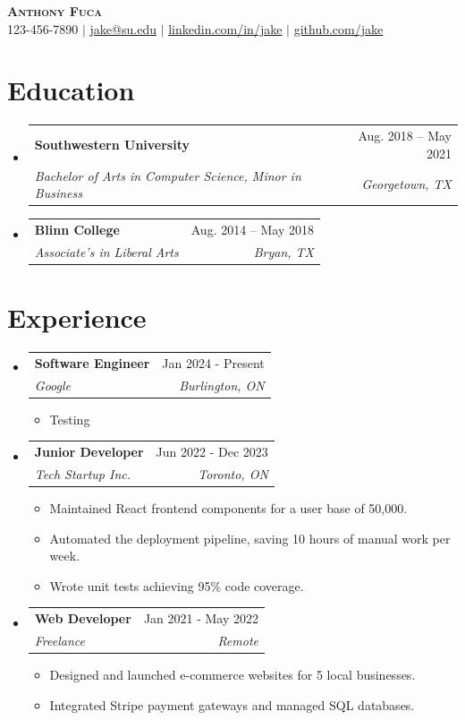 \documentclass[letterpaper,11pt]{article}
\makeatletter
\newcommand{\resumeItem}[1]{
  \item\small{
    {#1 \vspace{-2pt}}
  }
}
\newcommand{\resumeSubheading}[4]{
  \vspace{-2pt}\item
    \begin{tabular*}{0.97\textwidth}[t]{l@{\extracolsep{\fill}}r}
      \textbf{#1} & #2 \\
      \textit{\small#3} & \textit{\small #4} \\
    \end{tabular*}\vspace{-7pt}
}
\newcommand{\resumeSubHeadingListStart}{\begin{itemize}[leftmargin=0.15in, label={}]}
\newcommand{\resumeSubHeadingListEnd}{\end{itemize}}
\newcommand{\resumeItemListStart}{\begin{itemize}}
\newcommand{\resumeItemListEnd}{\end{itemize}\vspace{-5pt}}
\makeatother
\begin{document}

\begin{center}
    \textbf{\Huge \scshape Anthony Fuca} \\ \vspace{1pt}
    \small 123-456-7890 $|$ \href{mailto:x@x.com}{\underline{jake@su.edu}} $|$ 
    \href{https://linkedin.com/in/...}{\underline{linkedin.com/in/jake}} $|$
    \href{https://github.com/...}{\underline{github.com/jake}}
\end{center}

\section{Education}
    \resumeSubHeadingListStart
                    \resumeSubheading
        {Southwestern University}{Aug. 2018 -- May 2021}
        {Bachelor of Arts in Computer Science, Minor in Business}{Georgetown, TX}
                                    \resumeSubheading
        {Blinn College}{Aug. 2014 -- May 2018}
        {Associate's in Liberal Arts}{Bryan, TX}
                      \resumeSubHeadingListEnd
    \section{Experience}
    \resumeSubHeadingListStart
                    \resumeSubheading
        {Software Engineer}{Jan 2024 - Present}
        {Google}{Burlington, ON}
                  \resumeItemListStart
                \resumeItem{Testing}
              \resumeItemListEnd
                              \resumeSubheading
        {Junior Developer}{Jun 2022 - Dec 2023}
        {Tech Startup Inc.}{Toronto, ON}
                  \resumeItemListStart
                \resumeItem{Maintained React frontend components for a user base of 50,000.}
                \resumeItem{Automated the deployment pipeline, saving 10 hours of manual work per week.}
                \resumeItem{Wrote unit tests achieving 95\% code coverage.}
              \resumeItemListEnd
                              \resumeSubheading
        {Web Developer}{Jan 2021 - May 2022}
        {Freelance}{Remote}
                  \resumeItemListStart
                \resumeItem{Designed and launched e-commerce websites for 5 local businesses.}
                \resumeItem{Integrated Stripe payment gateways and managed SQL databases.}
              \resumeItemListEnd
                \resumeSubHeadingListEnd
\end{document}
